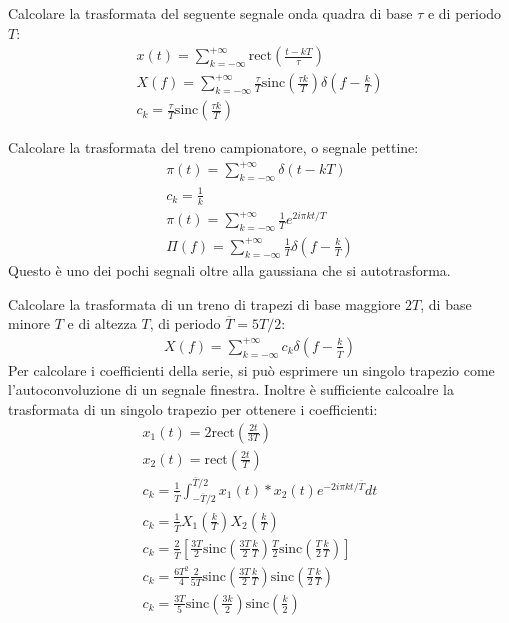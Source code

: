 \documentclass{article}
\numberwithin{equation}{subsection}
\begin{document}
Calcolare la trasformata del seguente segnale onda quadra di base $\tau$ e di periodo $T$:
\begin{gather*}
    x(t)=\displaystyle\sum_{k=-\infty}^{+\infty}\mbox{rect}\left(\frac{t-kT}{\tau}\right)\\
    X(f)=\displaystyle\sum_{k=-\infty}^{+\infty}\frac{\tau}{T}\mbox{sinc}\left(\frac{\tau k}{T}\right)\delta\left(f-\frac{k}{T}\right)\\
    c_k=\displaystyle\frac{\tau}{T}\mbox{sinc}\left(\frac{\tau k}{T}\right)
\end{gather*}

Calcolare la trasformata del treno campionatore, o segnale pettine:
\begin{gather*}
    \pi(t)=\displaystyle\sum_{k=-\infty}^{+\infty}\delta(t-kT)\\
    c_k=\displaystyle\frac{1}{k}\\
    \pi(t)=\displaystyle\sum_{k=-\infty}^{+\infty}\frac{1}{T}e^{2i\pi kt/T}\\
    \Pi(f)=\displaystyle\sum_{k=-\infty}^{+\infty}\frac{1}{T}\delta\left(f-\frac{k}{T}\right)
\end{gather*}
Questo è uno dei pochi segnali oltre alla gaussiana che si autotrasforma. 


Calcolare la trasformata di un treno di trapezi di base maggiore $2T$, di base minore $T$ e di altezza $T$, di periodo $\overline T=5T/2$:
\begin{gather*}
    X(f)=\displaystyle\sum_{k=-\infty}^{+\infty}c_k\delta\left(f-\frac{k}{\overline T}\right)
\end{gather*}
Per calcolare i coefficienti della serie, si può esprimere un singolo trapezio come l'autoconvoluzione di un segnale finestra. Inoltre è sufficiente calcoalre la 
trasformata di un singolo trapezio per ottenere i coefficienti:
\begin{gather*}
    x_1(t)=2\displaystyle\mbox{rect}\left(\frac{2t}{3T}\right)\\
    x_2(t)=\displaystyle\mbox{rect}\left(\frac{2t}{T}\right)\\
    c_k=\displaystyle\frac{1}{\overline T}\int_{-\overline T/2}^{\overline T/2}x_1(t)*x_2(t)e^{-2i\pi kt/\overline T}dt\\
    c_k=\displaystyle\frac{1}{\overline T}X_1\left(\frac{k}{ T}\right)X_2\left(\frac{k}{ T}\right)\\
    c_k=\displaystyle\frac{2}{\overline T}\left[\frac{3T}{2}\mbox{sinc}\left(\frac{3T}{2}\frac{k}{ T}\right)\frac{T}{2}\mbox{sinc}\left(\frac{T}{2}\frac{k}{ T}\right)\right]\\
    c_k=\displaystyle\frac{6T^2}{4}\frac{2}{5T}\mbox{sinc}\left(\frac{3T}{2}\frac{k}{ T}\right)\mbox{sinc}\left(\frac{T}{2}\frac{k}{ T}\right)\\
    c_k=\displaystyle\frac{3T}{5}\mbox{sinc}\left(\frac{3k}{2}\right)\mbox{sinc}\left(\frac{k}{2}\right)
\end{gather*}
\end{document}
